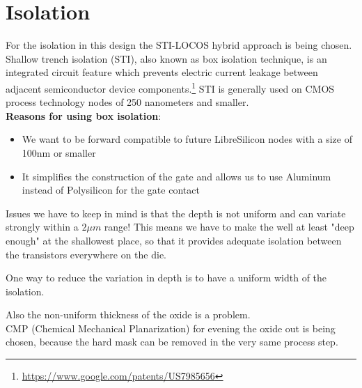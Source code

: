\section{Isolation}
For the isolation in this design the STI-LOCOS hybrid approach is being chosen.
Shallow trench isolation (STI), also known as box isolation technique, is an integrated circuit feature which prevents electric current leakage between adjacent semiconductor device components.\footnote{\url{https://www.google.com/patents/US7985656}}
STI is generally used on CMOS process technology nodes of 250 nanometers and smaller.\\

\textbf{Reasons for using box isolation}:\begin{itemize}
	\item We want to be forward compatible to future LibreSilicon nodes with a size of 100nm or smaller
	\item It simplifies the construction of the gate and allows us to use Aluminum instead of Polysilicon for the gate contact
\end{itemize}

Issues we have to keep in mind is that the depth is not uniform and can variate strongly within a $2 \mu m$ range!
This means we have to make the well at least "deep enough" at the shallowest place, so that it provides adequate isolation between the transistors everywhere on the die.

One way to reduce the variation in depth is to have a uniform width of the isolation.

Also the non-uniform thickness of the oxide is a problem. \\

CMP (Chemical Mechanical Planarization) for evening the oxide out is being chosen, because the hard mask can be removed in the very same process step.